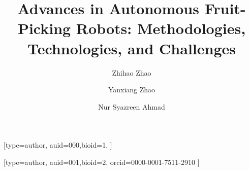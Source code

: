 \documentclass[a4paper,fleqn]{cas-dc}
\begin{document}
\let\ref\Cref 		
\let\eqref\Cref 	
\let\autoref\Cref 	
\let\WriteBookmarks\relax
\def\floatpagepagefraction{1}
\def\textpagefraction{.001}


\title [mode = title]{Advances in Autonomous Fruit-Picking Robots: Methodologies, Technologies, and Challenges}    




\author[1,2]{Zhihao Zhao}[type=author, 
                        auid=000,bioid=1,
                        ]

\address[1]{School of Electrical and Electronic Engineering, Universiti Sains Malaysia, 14300 Nibong Tebal, Penang, Malaysia}

\author[3]{Yanxiang Zhao}
\author[1]{Nur Syazreen Ahmad}[type=author, 
                        auid=001,bioid=2,
                        orcid=0000-0001-7511-2910
                        ]
\cormark[1]

\address[2]{YanTai Engineering and Technology College, 264006 YanTai, Shandong, China}
\address[3]{Central South University, Changsha, Hunan, 410083, China}
\end{document}

